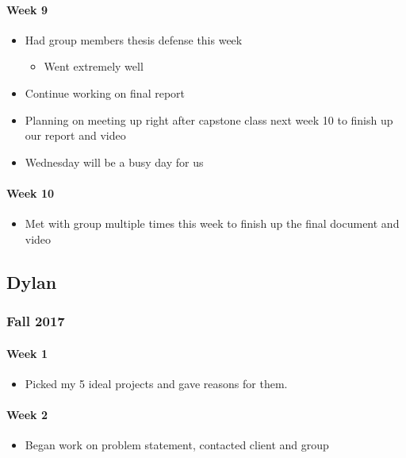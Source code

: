 \documentclass[onecolumn, draftclsnofoot,10pt, compsoc]{IEEEtran}
\begin{document}
      \paragraph{Week 9}
        \begin{itemize}
          \item Had group members thesis defense this week
          \begin{itemize}
            \item Went extremely well
          \end{itemize}
          \item Continue working on final report
          \item Planning on meeting up right after capstone class next week 10 to finish up our report and video
          \item Wednesday will be a busy day for us
        \end{itemize}

      \paragraph{Week 10}
        \begin{itemize}
          \item Met with group multiple times this week to finish up the final document and video
        \end{itemize}

  \subsection{Dylan}
    \subsubsection{Fall 2017}
      \paragraph{Week 1}
        \begin{itemize}
          \item Picked my 5 ideal projects and gave reasons for them.
        \end{itemize}

      \paragraph{Week 2}
        \begin{itemize}
          \item Began work on problem statement, contacted client and group
        \end{itemize}
\end{document}
